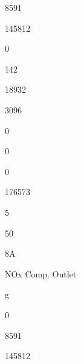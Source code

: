 \documentclass[a4paper,portrait,12pt]{article}
\begin{document}
8591





145812





0





142





18932





3096





0





0





0





176573





5





50





\begin{flushleft}
8A
\end{flushleft}





\begin{flushleft}
NOx Comp. Outlet
\end{flushleft}





\begin{flushleft}
g
\end{flushleft}





0





8591





145812
\end{document}
